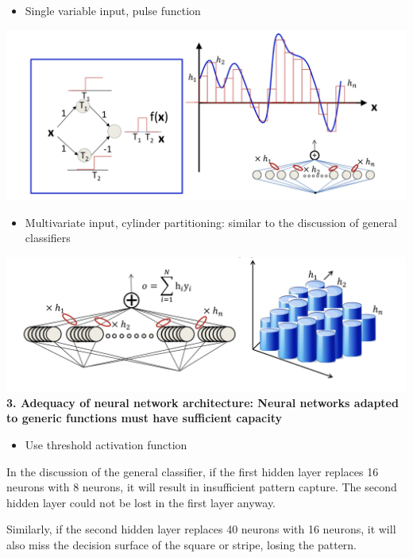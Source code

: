 \documentclass{article}
\begin{document}
	
	\begin{itemize}
		\item Single variable input, pulse function
	\end{itemize}
	
	\includegraphics[scale=0.2]{33.png}
	
	\begin{itemize}
		\item Multivariate input, cylinder partitioning: similar to the discussion of general classifiers
	\end{itemize}
	
	\includegraphics[scale=0.2]{34.png} \\
	
	\textbf{3. Adequacy of neural network architecture: Neural networks adapted to generic functions must have sufficient capacity}
	
	\begin{itemize}
		\item Use threshold activation function
	\end{itemize}
	
	In the discussion of the general classifier, if the first hidden layer replaces 16 neurons with 8 neurons, it will result in insufficient pattern capture. The second hidden layer could not be lost in the first layer anyway.
	
	Similarly, if the second hidden layer replaces 40 neurons with 16 neurons, it will also miss the decision surface of the square or stripe, losing the pattern.
	
\end{document}
